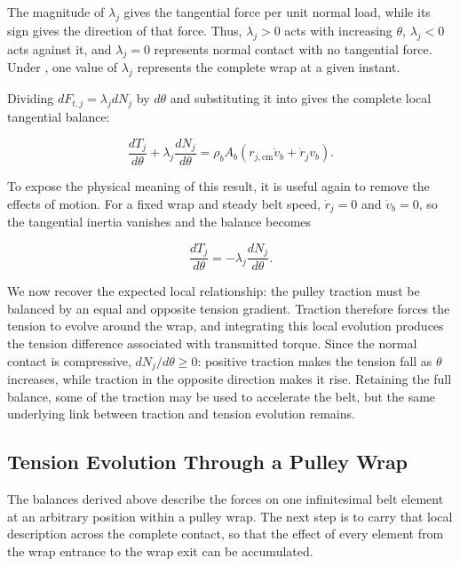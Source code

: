 \documentclass[11pt]{report}
\numberwithin{equation}{section}
\newcounter{assump}
\begin{document}
The magnitude of \(\lambda_j\) gives the tangential force per unit normal
load, while its sign gives the direction of that force. Thus,
\(\lambda_j>0\) acts with increasing \(\theta\),
\(\lambda_j<0\) acts against it, and \(\lambda_j=0\) represents normal contact
with no tangential force. Under
, one value of \(\lambda_j\) represents
the complete wrap at a given instant.

Dividing \(dF_{t,j}=\lambda_jdN_j\) by \(d\theta\) and substituting it into
 gives the complete local tangential
balance:

\begin{equation}
\boxed{
    \frac{dT_j}{d\theta}
    +
    \lambda_j\frac{dN_j}{d\theta}
    =
    \rho_bA_b
    \left(
        r_{j,\mathrm{cm}}\dot v_b
        +
        \dot r_jv_b
    \right).
}
    \label{eq:wrap_tangential_balance}
\end{equation}

To expose the physical meaning of this result, it is useful again to remove
the effects of motion. For a fixed wrap and steady belt speed,
\(\dot r_j=0\) and \(\dot v_b=0\), so the tangential inertia vanishes and the
balance becomes

\begin{equation}
    \frac{dT_j}{d\theta}
    =
    -\lambda_j\frac{dN_j}{d\theta}.
    \label{eq:wrap_steady_tangential_balance}
\end{equation}

We now recover the expected local relationship:
the pulley traction must be balanced by an equal and opposite tension
gradient. Traction therefore forces the tension to evolve around the wrap, and
integrating this local evolution produces the tension difference associated
with transmitted torque. Since the normal contact is compressive,
\(dN_j/d\theta\geq0\): positive traction makes the tension fall as
\(\theta\) increases, while traction in the opposite direction makes it rise.
Retaining the full balance, some of the traction may be used to accelerate the belt,
but the same underlying link between traction and tension evolution remains.

\subsection{Tension Evolution Through a Pulley Wrap}
\label{sec:wrap_tension_evolution}

The balances derived above describe the forces on one infinitesimal belt
element at an arbitrary position within a pulley wrap. The next step is to
carry that local description across the complete contact, so that the effect
of every element from the wrap entrance to the wrap exit can be accumulated.
\end{document}
